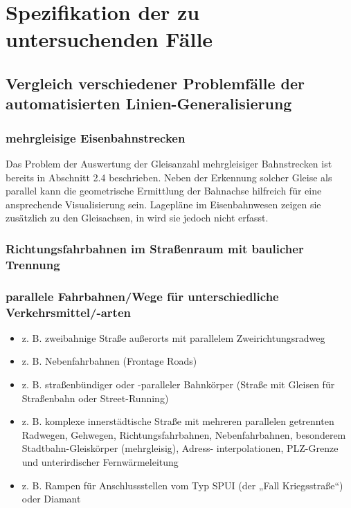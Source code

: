 \documentclass[../main/thesis.tex]{subfiles}
\begin{document}
\chapter{Spezifikation der zu untersuchenden Fälle}



\section{Vergleich verschiedener Problemfälle der automatisierten Linien-Generalisierung}


\subsection{mehrgleisige Eisenbahnstrecken}

Das Problem der Auswertung der Gleisanzahl mehrgleisiger Bahnstrecken ist bereits in Abschnitt 2.4 beschrieben. Neben der Erkennung solcher Gleise als parallel kann die geometrische Ermittlung der Bahnachse hilfreich für eine ansprechende Visualisierung sein. Lagepläne im Eisenbahnwesen zeigen sie zusätzlich zu den Gleisachsen, in \osm wird sie jedoch nicht erfasst.



\subsection{Richtungsfahrbahnen im Straßenraum mit baulicher Trennung}


\subsection{parallele Fahrbahnen/Wege für unterschiedliche Verkehrsmittel/-arten}
\begin{itemize}
	\item z. B. zweibahnige Straße außerorts mit parallelem Zweirichtungsradweg
	\item z. B. Nebenfahrbahnen (Frontage Roads)
	\item z. B. straßenbündiger oder -paralleler Bahnkörper (Straße mit Gleisen für Straßenbahn oder Street-Running)
	\item z. B. komplexe innerstädtische Straße mit mehreren parallelen getrennten Radwegen, Gehwegen,
Richtungsfahrbahnen, Nebenfahrbahnen, besonderem Stadtbahn-Gleiskörper (mehrgleisig), Adress-
interpolationen, PLZ-Grenze und unterirdischer Fernwärmeleitung
	\item z. B. Rampen für Anschlussstellen vom Typ SPUI (der „Fall Kriegsstraße“) oder Diamant
\end{itemize}
\end{document}
